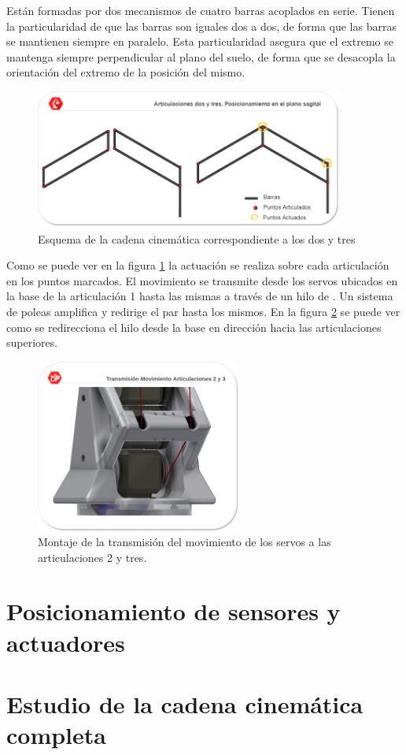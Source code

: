     Están formadas por dos mecanismos de cuatro barras acoplados en serie. Tienen la particularidad de que las barras son iguales dos a dos, de forma que las barras se mantienen siempre en paralelo. Esta particularidad asegura que el extremo se mantenga siempre perpendicular al plano del suelo, de forma que se desacopla la orientación del extremo de la posición del mismo.
    \\ 
    
    \begin{figure}[H]
    	\centering
    	\includegraphics[width=0.9\textwidth]{figuras/Imagenes_Mecanica/mecanismos_4_barras.png}   
    	\caption{Esquema de la cadena cinemática correspondiente a los  dos y tres}
    	\label{fig:Mecanica:4_bar_mecanism}
    \end{figure}
    
    Como se puede ver en la figura \ref{fig:Mecanica:4_bar_mecanism} la actuación se realiza sobre cada articulación en los puntos marcados. El movimiento se transmite desde los servos ubicados en la base de la articulación 1 hasta las mismas a través de un hilo de . Un sistema de poleas amplifica y redirige el par hasta los mismos. En la figura \ref{fig:Mecanica:transmision_poleas_cuerda} se puede ver como se redirecciona el hilo desde la base en dirección hacia las articulaciones superiores.
    
   	\begin{figure}[H]
   		\centering
   		\includegraphics[width=0.6\textwidth]{figuras/Imagenes_Mecanica/TransmisionMotorArticulacion.png}   
   		\caption{Montaje de la transmisión del movimiento de los servos a las articulaciones 2 y tres.}
   		\label{fig:Mecanica:transmision_poleas_cuerda}
   	\end{figure}

\section{Posicionamiento de sensores y actuadores} \label{sec:Mecanica:sensores_actuadore}

\section{Estudio de la cadena cinemática completa} \label{sec:Mecanica:cadena_cinematica}